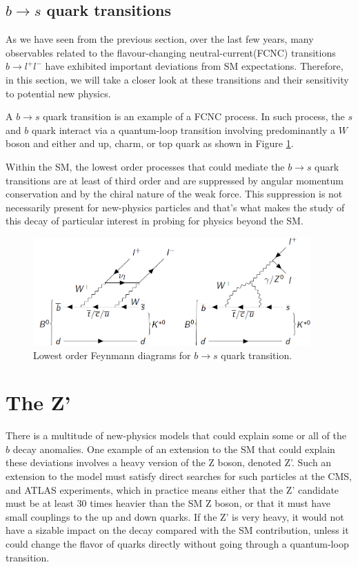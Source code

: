 \subsection{$b\rightarrow s$ quark transitions}
As we have seen from the previous section, over the last few years, many observables related to the flavour-changing neutral-current(FCNC) transitions $b\rightarrow l^{+}l^{-}$ have exhibited important deviations from SM expectations. Therefore, in this section, we will take a closer look at these transitions and their sensitivity to potential new physics.

A $b\rightarrow s$ quark transition is an example of a FCNC process\cite{NatFCNC}. In such process, the $s$ and $b$ quark interact via a quantum-loop transition involving predominantly a $W$ boson and either and up, charm, or top quark as shown in Figure \ref{fig:bmesonpic}.

Within the SM, the lowest order processes that could mediate the $b\rightarrow s$ quark transitions are at least of third order and are suppressed by angular momentum conservation and by the chiral nature of the weak force. This suppression is not necessarily present for new-physics particles and that's what makes the study of this decay of particular interest in probing for physics beyond the SM.

 \begin{figure}[H]
 	\centering
 	\includegraphics[width=0.95\textwidth]{figures/bmeson.png}
 	\singlespace
 	\caption{Lowest order Feynmann diagrams for $b\rightarrow s$ quark transition.}
 	\label{fig:bmesonpic}
 \end{figure}

\section{The Z'}
There is a multitude of new-physics models that could explain some or all of the $b$ decay anomalies. One example of an extension to the SM that could explain these deviations involves a heavy version of the Z boson, denoted Z'\cite{Buras:2013}. Such an extension to the model must satisfy direct searches for such particles at the CMS\cite{201757}, \cite{Sirunyan:2018exx} and ATLAS \cite{ATLAS-CONF-2016-045} experiments, which in practice means either that the Z' candidate must be at least 30 times heavier than the SM Z boson, or that it must have small couplings to the up and down quarks. If the Z' is very heavy, it would not have a sizable impact on the decay compared with the SM contribution, unless it could change the flavor of quarks directly without going through a quantum-loop transition.

